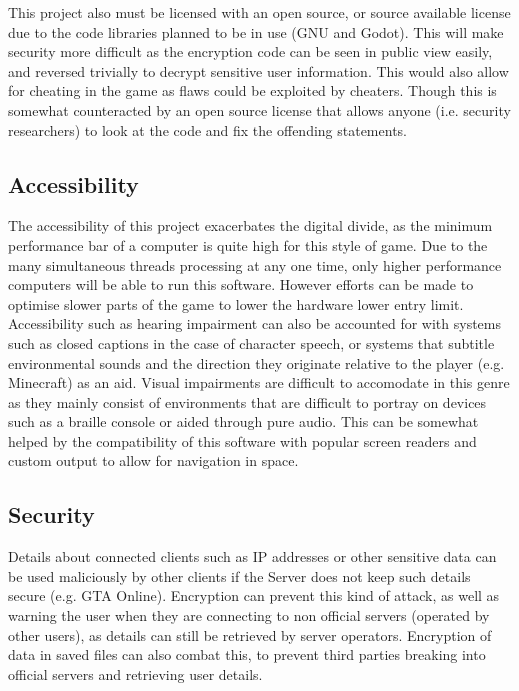 \documentclass[12pt, DIV=calc]{scrartcl}
\begin{document}
\noindent This project also must be licensed with an open source, or source available license due to the code libraries planned to be in use (GNU and Godot). This will make security more difficult as the encryption code can be seen in public view easily, and reversed trivially to decrypt sensitive user information. This would also allow for cheating in the game as flaws could be exploited by cheaters. Though this is somewhat counteracted by an open source license that allows anyone (i.e. security researchers) to look at the code and fix the offending statements.

\subsection{Accessibility}
The accessibility of this project exacerbates the digital divide, as the minimum performance bar of a computer is quite high for this style of game. Due to the many simultaneous threads processing at any one time, only higher performance computers will be able to run this software. However efforts can be made to optimise slower parts of the game to lower the hardware lower entry limit. \\

\noindent Accessibility such as hearing impairment can also be accounted for with systems such as closed captions in the case of character speech, or systems that subtitle environmental sounds and the direction they originate relative to the player (e.g. Minecraft) as an aid. Visual impairments are difficult to accomodate in this genre as they mainly consist of environments that are difficult to portray on devices such as a braille console or aided through pure audio. This can be somewhat helped by the compatibility of this software with popular screen readers and custom output to allow for navigation in space.  

\subsection{Security}
Details about connected clients such as IP addresses or other sensitive data can be used maliciously by other clients if the Server does not keep such details secure (e.g. GTA Online). Encryption can prevent this kind of attack, as well as warning the user when they are connecting to non official servers (operated by other users), as details can still be retrieved by server operators. Encryption of data in saved files can also combat this, to prevent third parties breaking into official servers and retrieving user details. 
\end{document}
